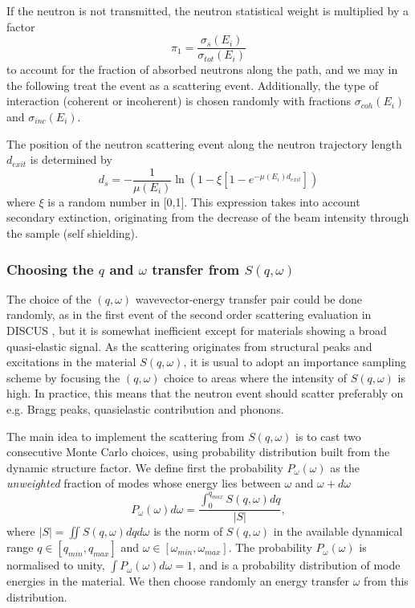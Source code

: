 If the neutron is not transmitted, the neutron statistical weight is multiplied by a factor
\begin{equation}
\pi_1 = \frac{\sigma_s(E_i)}{\sigma_{tot}(E_i)}
\end{equation}
to account for the fraction of absorbed neutrons along the path, and we may in the following treat the event as a scattering event.
Additionally, the type of interaction (coherent or incoherent) is chosen randomly with fractions $\sigma_{coh}(E_i)$ and $\sigma_{inc}(E_i)$.

The position of the neutron scattering event along the neutron trajectory length $d_{exit}$ is determined by \cite{Mildner77,discus}
\begin{equation}
d_{s} = -\frac{1}{\mu(E_i)} \ln(1 - \xi[1 -e^{-\mu(E_i) d_{exit}}])
\end{equation}
where $\xi$ is a random number in [0,1]. This expression takes into account secondary extinction, originating from the decrease of the beam intensity through the sample (self shielding).

\subsubsection{Choosing the $q$ and $\omega$ transfer from $S(q, \omega)$ }
\label{s:choose-qw}

The choice of the $(q, \omega)$ wavevector-energy transfer pair could be done randomly, as in the first event of the second order scattering evaluation in DISCUS \cite{discus}, but it is somewhat inefficient except for materials showing a broad quasi-elastic signal. As the scattering originates from structural peaks and excitations in the material $S(q, \omega)$, it is usual \cite{mscat} to adopt an importance sampling scheme by focusing the $(q, \omega)$ choice to areas where the intensity of $S(q, \omega)$ is high. In practice, this means that the neutron event should scatter preferably on e.g. Bragg peaks, quasielastic contribution and phonons.

The main idea to implement the scattering from $S(q, \omega)$ is to cast two consecutive Monte Carlo choices, using probability distribution built from the dynamic structure factor.
We define first the probability $P_{\omega}(\omega)$ as the \emph{unweighted} fraction of modes whose energy lies between $\omega$ and $\omega+d\omega$
\begin{equation}
P_{\omega}(\omega) d\omega = \frac{\int_0^{q_{max}} S(q,\omega) dq}{|S|},
\end{equation}
where $|S| = \iint S(q,\omega) dq d\omega$ is the norm of $S(q,\omega)$ in the available dynamical range $q \in [q_{min}, q_{max}]$ and $\omega \in [\omega_{min}, \omega_{max}]$.
The probability $P_{\omega}(\omega)$ is normalised to unity, $\int P_{\omega}(\omega) d\omega = 1$, and is a probability distribution of mode energies in the material. We then choose randomly an energy transfer $\omega$ from this distribution.

